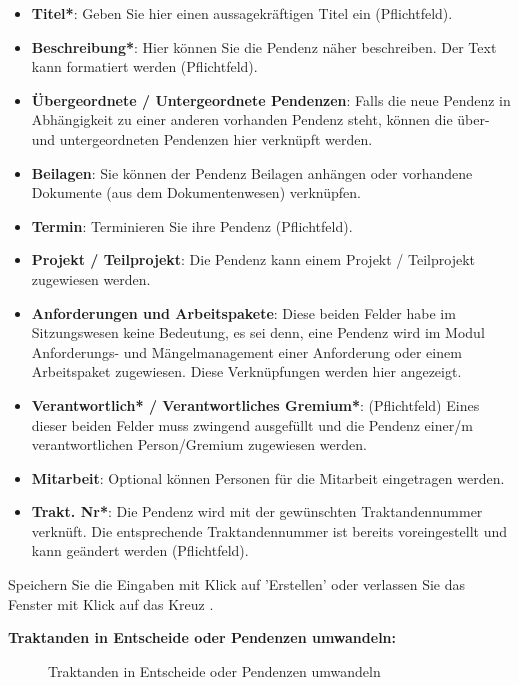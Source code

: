 \begin{itemize}
\item \textbf{Titel*}: Geben Sie hier einen aussagekräftigen Titel ein (Pflichtfeld).
\item \textbf{Beschreibung*}: Hier können Sie die Pendenz näher beschreiben. Der Text kann formatiert werden (Pflichtfeld).
\item \textbf{Übergeordnete / Untergeordnete Pendenzen}: Falls die neue Pendenz in Abhängigkeit zu einer anderen vorhanden Pendenz steht, können die über- und untergeordneten Pendenzen hier verknüpft werden.
\item \textbf{Beilagen}: Sie können der Pendenz Beilagen anhängen oder vorhandene Dokumente (aus dem Dokumentenwesen) verknüpfen. 
\item \textbf{Termin}: Terminieren Sie ihre Pendenz (Pflichtfeld).
\item \textbf{Projekt / Teilprojekt}: Die Pendenz kann einem Projekt / Teilprojekt zugewiesen werden.
\item \textbf{Anforderungen und Arbeitspakete}: Diese beiden Felder habe im Sitzungswesen keine Bedeutung, es sei denn, eine Pendenz wird im Modul Anforderungs- und Mängelmanagement einer Anforderung oder einem Arbeitspaket zugewiesen. Diese Verknüpfungen werden hier angezeigt.
\item \textbf{Verantwortlich* / Verantwortliches Gremium*}: (Pflichtfeld) Eines dieser beiden Felder muss zwingend ausgefüllt und die Pendenz einer/m verantwortlichen Person/Gremium zugewiesen werden.
\item \textbf{Mitarbeit}: Optional können Personen für die Mitarbeit eingetragen werden.
\item \textbf{Trakt. Nr*}: Die Pendenz wird mit der gewünschten Traktandennummer verknüft. Die entsprechende Traktandennummer ist bereits voreingestellt und kann geändert werden (Pflichtfeld).
\end{itemize}

Speichern Sie die Eingaben mit Klick auf 'Erstellen'  oder verlassen Sie das Fenster mit Klick auf das Kreuz .

\vspace{\baselineskip}

\textbf{Traktanden in Entscheide oder Pendenzen umwandeln:}

\begin{figure}[H]
\caption{Traktanden in Entscheide oder Pendenzen umwandeln}
\end{figure}


